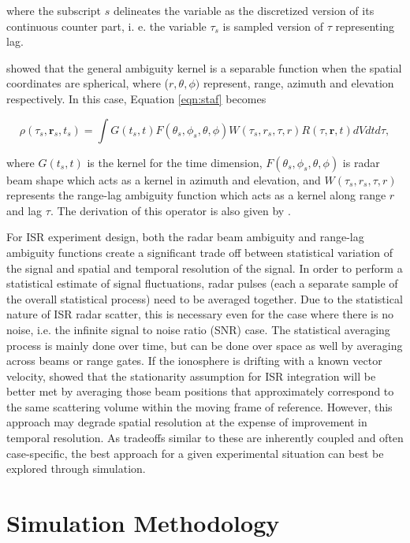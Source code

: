 \documentclass[draft,ras]{agutex}
\begin{document}
\begin{article}
\noindent where the subscript $s$ delineates the variable as the discretized version of its continuous counter part, i. e. the variable $\tau_s$ is sampled version of $\tau$ representing lag. 

\citet{RDS:RDS20236} showed that the general ambiguity kernel is a separable function when the spatial coordinates are spherical, where ($r,\theta,\phi)$ represent, range, azimuth and elevation respectively.  In this case, Equation \ref{eqn:staf} becomes

\begin{equation}
\label{eqn:stafbrok}
\rho(\tau_s,\mathbf{r}_s,t_s)= \int G(t_s,t)F(\theta_s,\phi_s,\theta,\phi)W(\tau_s,r_s,\tau,r) R(\tau,\mathbf{r},t) dVdt d\tau,
\end{equation}

\noindent where $G(t_s,t)$ is the kernel for the time dimension, $F(\theta_s,\phi_s,\theta,\phi)$ is radar beam shape which acts as a kernel in azimuth and elevation, and $W(\tau_s,r_s,\tau,r) $ represents the range-lag ambiguity function which acts as a kernel along range $r$ and lag $\tau$. The derivation of this operator is also given by \citet{RDS:RDS20236}.

For ISR experiment design, both the radar beam ambiguity and range-lag ambiguity functions create a significant trade off between statistical variation of the signal and spatial and temporal resolution of the signal. In order to perform a statistical estimate of signal fluctuations, radar pulses (each a separate sample of the overall statistical process) need to be averaged together. Due to the statistical nature of ISR radar scatter, this is necessary even for the case where there is no noise, i.e. the infinite signal to noise ratio (SNR) case. The statistical averaging process is mainly done over time, but can be done over space as well by averaging across beams or range gates. If the ionosphere is drifting with a known vector velocity, \citet{RDS:RDS20236} showed that the stationarity assumption for ISR integration will be better met by averaging those beam positions that approximately correspond to the same scattering volume within the moving frame of reference. However, this approach may degrade spatial resolution at the expense of improvement in temporal resolution. As tradeoffs similar to these are inherently coupled and often case-specific, the best approach for a given experimental situation can best be explored through simulation.
\section{Simulation Methodology}


\end{article}
\end{document}
